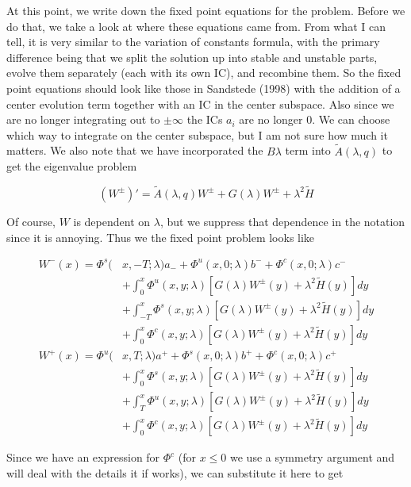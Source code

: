 \documentclass[12pt]{article}
\begin{document}
At this point, we write down the fixed point equations for the problem. Before we do that, we take a look at where these equations came from. From what I can tell, it is very similar to the variation of constants formula, with the primary difference being that we split the solution up into stable and unstable parts, evolve them separately (each with its own IC), and recombine them. So the fixed point equations should look like those in Sandstede (1998) with the addition of a center evolution term together with an IC in the center subspace. Also since we are no longer integrating out to $\pm \infty$ the ICs $a_i$ are no longer 0. We can choose which way to integrate on the center subspace, but I am not sure how much it matters. We also note that we have incorporated the $B \lambda$ term into $\tilde{A}(\lambda, q)$ to get the eigenvalue problem

\[
(W^\pm)' = \tilde{A}(\lambda, q) W^\pm + G(\lambda)W^\pm + \lambda^2 \tilde{H}
\]

Of course, $W$ is dependent on $\lambda$, but we suppress that dependence in the notation since it is annoying. Thus we the fixed point problem looks like

\begin{align*}
W^-(x) = \Phi^s(&x, -T; \lambda)a_- + \Phi^u(x, 0; \lambda)b^- + \Phi^c(x, 0; \lambda)c^- \\
&+ \int_0^x \Phi^u(x, y; \lambda)[ G(\lambda)W^\pm(y) + \lambda^2 \tilde{H}(y) ] dy \\
&+ \int_{-T}^x \Phi^s(x, y; \lambda) [ G(\lambda)W^\pm(y) + \lambda^2 \tilde{H}(y) ] dy \\
&+ \int_0^x \Phi^c(x, y; \lambda) [ G(\lambda)W^\pm(y) + \lambda^2 \tilde{H}(y) ]dy \\
W^+(x) = \Phi^u(&x, T; \lambda)a^+ + \Phi^s(x, 0; \lambda)b^+ + \Phi^c(x, 0; \lambda)c^+ \\
&+ \int_0^x \Phi^s(x, y; \lambda) [ G(\lambda)W^\pm(y) + \lambda^2 \tilde{H}(y) ] dy \\
&+ \int_T^x \Phi^u(x, y; \lambda) [ G(\lambda)W^\pm(y) + \lambda^2 \tilde{H}(y) ] dy \\
&+ \int_0^x \Phi^c(x, y; \lambda) [ G(\lambda)W^\pm(y) + \lambda^2 \tilde{H}(y) ] dy
\end{align*}

Since we have an expression for $\Phi^c$ (for $x \leq 0$ we use a symmetry argument and will deal with the details it if works), we can substitute it here to get
\end{document}
